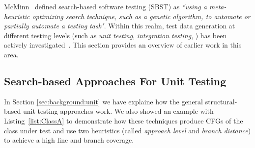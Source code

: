 
McMinn~\cite{McMinn2004} defined search-based software testing (SBST) as \textit{``using a meta-heuristic optimizing search technique, such as a genetic algorithm, to automate or partially automate a testing task"}.
Within this realm, test data generation at different testing levels (such as \textit{unit testing}, \textit{integration testing}, \etc) has been actively investigated~\cite{McMinn2004}. This section 
provides an overview of earlier work in this area.



\subsection{Search-based Approaches For Unit Testing}
In Section \ref{sec:background:unit} we have explaine how the general structural-based unit testing approaches work.
We also showed an example with Listing~\ref{list:ClassA} to demonstrate how these techniques produce CFGs of the class under test and use two heuristics (called \textit{approach level} and \textit{branch distance}) to achieve a high line and branch coverage.


